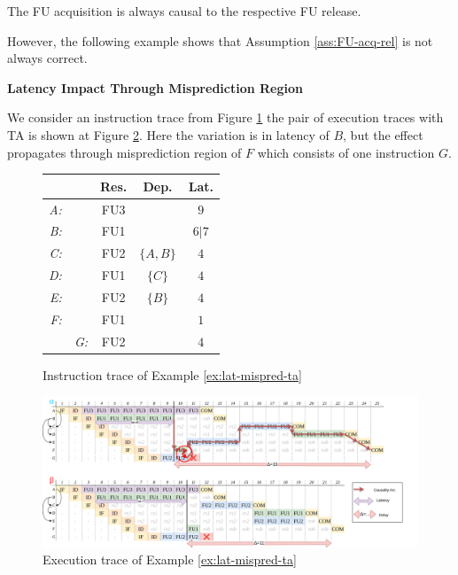 
\begin{assumption}
The FU acquisition is always causal to the respective FU release.
\label{ass:FU-acq-rel}
\end{assumption}

However, the following example shows that Assumption \ref{ass:FU-acq-rel} is not always correct. 

\begin{example}
\textbf{Latency Impact Through Misprediction Region}

We consider an instruction trace from Figure \ref{fig:lat-mispred-ta-input} the pair of execution traces with TA is shown at Figure \ref{fig:lat-mispred-ta-trace}. Here the variation is in latency of $B$, but the effect propagates through misprediction region of $F$ which consists of one instruction $G$. 
\label{ex:lat-mispred-ta}
\end{example}


\begin{figure}[H]
    \centering
    \begin{tabular}{rr|ccc}
    &  & Res. & Dep. & Lat. \\ \hline
    \textit{A:} &  & FU3 &  & $9$ \\
    \textit{B:} &  & FU1 &  & $6|7$ \\
    \textit{C:} &  & FU2 & $\{A, B\}$ & $4$ \\
    \textit{D:} &  & FU1 & $\{C\}$ & $4$ \\
    \textit{E:} &  & FU2 & $\{B\}$ & $4$ \\
    \textit{F:} &  & FU1 &  & $1$ \\
    & \textit{G:} & FU2 &  & $4$ \\
    \end{tabular}
    \caption{Instruction trace of Example \ref{ex:lat-mispred-ta}}
    \label{fig:lat-mispred-ta-input}
\end{figure}


\begin{figure}[H]
    \centering
    \includegraphics[width=\textwidth]{figures/lat-mispred.png}
    \caption{Execution trace of Example \ref{ex:lat-mispred-ta}}
    \label{fig:lat-mispred-ta-trace}
\end{figure}

